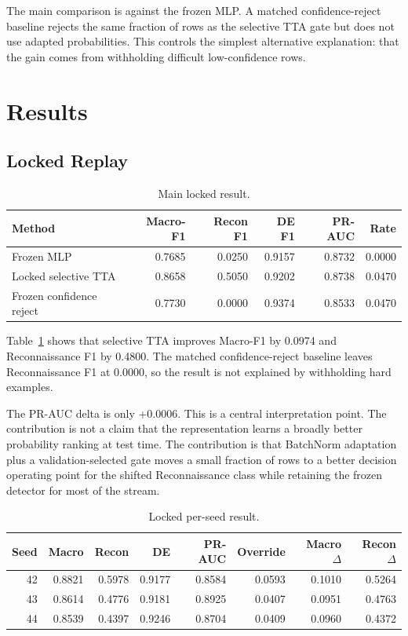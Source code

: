 \documentclass[10pt]{article}
\begin{document}
The main comparison is against the frozen MLP.
A matched confidence-reject baseline rejects the same fraction of rows as the selective TTA gate but does not use adapted probabilities.
This controls the simplest alternative explanation: that the gain comes from withholding difficult low-confidence rows.

\section{Results}

\subsection{Locked Replay}

\begin{table}[tbp]
  \centering
  \caption{Main locked result.}
  \label{tab:main}
  \small
  \setlength{\tabcolsep}{5pt}
  \begin{tabular}{lrrrrr}
    \toprule
    Method & Macro-F1 & Recon F1 & DE F1 & PR-AUC & Rate \\
    \midrule
    Frozen MLP & 0.7685 & 0.0250 & 0.9157 & 0.8732 & 0.0000 \\
    Locked selective TTA & 0.8658 & 0.5050 & 0.9202 & 0.8738 & 0.0470 \\
    Frozen confidence reject & 0.7730 & 0.0000 & 0.9374 & 0.8533 & 0.0470 \\
    \bottomrule
  \end{tabular}
\end{table}

Table~\ref{tab:main} shows that selective TTA improves Macro-F1 by 0.0974 and Reconnaissance F1 by 0.4800.
The matched confidence-reject baseline leaves Reconnaissance F1 at 0.0000, so the result is not explained by withholding hard examples.

The PR-AUC delta is only +0.0006.
This is a central interpretation point.
The contribution is not a claim that the representation learns a broadly better probability ranking at test time.
The contribution is that BatchNorm adaptation plus a validation-selected gate moves a small fraction of rows to a better decision operating point for the shifted Reconnaissance class while retaining the frozen detector for most of the stream.

\begin{table}[tbp]
  \centering
  \caption{Locked per-seed result.}
  \label{tab:seeds}
  \small
  \setlength{\tabcolsep}{4pt}
  \begin{tabular}{rrrrrrrr}
    \toprule
    Seed & Macro & Recon & DE & PR-AUC & Override & Macro $\Delta$ & Recon $\Delta$ \\
    \midrule
    42 & 0.8821 & 0.5978 & 0.9177 & 0.8584 & 0.0593 & 0.1010 & 0.5264 \\
    43 & 0.8614 & 0.4776 & 0.9181 & 0.8925 & 0.0407 & 0.0951 & 0.4763 \\
    44 & 0.8539 & 0.4397 & 0.9246 & 0.8704 & 0.0409 & 0.0960 & 0.4372 \\
    \bottomrule
  \end{tabular}
\end{table}
\end{document}
